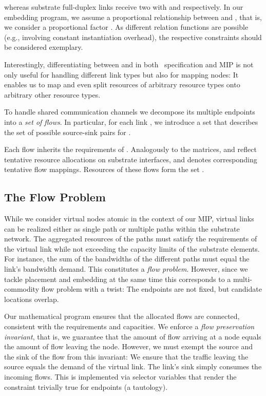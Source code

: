 \documentclass[conference,10pt]{IEEEtran}
\newcommand{\CloudNet}{\text{CloudNet}}
\begin{document}
whereas substrate full-duplex links receive two  with
 and
 respectively.
In our embedding program, we
assume a proportional relationship between  and , that is,
we consider a proportional factor .
As different relation functions are possible (e.g., involving constant instantiation overhead), the respective constraints should be considered exemplary.

Interestingly, differentiating between  and  in both
\CloudNet\ specification and MIP is not only useful for
handling different link types but also for mapping nodes:
It enables us to map and even split resources of arbitrary resource types onto arbitrary other resource types.

To handle shared communication
channels we decompose its multiple endpoints into a \emph{set of
flows}. In particular, for each link , we introduce a set 
that describes the set of possible source-sink pairs for .

Each flow  inherits the requirements of .
Analogously to the  matrices,  and  reflect tentative resource allocations on substrate interfaces,
and  denotes corresponding tentative flow mappings. Resources of these flows  form the set .

\subsection{The Flow Problem} \label{ssec:map:approach:flow}

While we consider virtual nodes atomic in the context of our MIP,
virtual links can be realized either as
single path or multiple paths within the substrate network. The
aggregated resources of the paths must satisfy the requirements of
the virtual link while not exceeding the capacity limits of the
substrate elements. For instance, the sum of the bandwidths of the
different paths must equal the link's bandwidth demand. This
constitutes a \emph{flow problem}. However, since we tackle
placement and embedding at the same time this corresponds to a
multi-commodity flow problem with a twist: The endpoints are not
fixed, but candidate locations overlap.

Our mathematical program ensures that the allocated flows are
connected, consistent with the requirements and capacities.
We enforce a \emph{flow
preservation invariant}, that is, we guarantee that the amount of
flow arriving at a node equals the amount of flow leaving the node.
However, we must exempt the source and the sink of the flow from
this invariant: We ensure that the traffic leaving the source equals
the demand of the virtual link. The link's sink simply consumes the
incoming flows. This is implemented via selector variables that
render the constraint trivially true for endpoints (a tautology).
\end{document}
